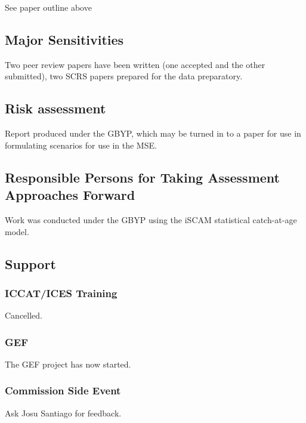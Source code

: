 See paper outline above

\subsection{Major Sensitivities} 

Two peer review papers have been written (one accepted and the other submitted),
two SCRS papers prepared for the data preparatory.

\subsection{Risk assessment} 
Report produced under the GBYP, which may be turned in to a paper for use in
formulating scenarios for use in the MSE.

\subsection{Responsible Persons for Taking Assessment Approaches Forward} 

Work was conducted under the GBYP using the iSCAM statistical catch-at-age model.

\subsection{Support} 

\subsubsection{ICCAT/ICES Training} 
Cancelled.

\subsubsection{GEF} 
The GEF project has now started.

\subsubsection{Commission Side Event} 
Ask Josu Santiago for feedback.
